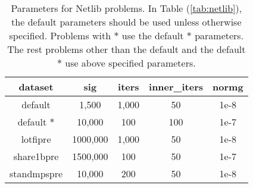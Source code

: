 \documentclass[a4paper]{article}
\begin{document}
\begin{table}[h]
	\centering
	\begin{tabular}{ccccc}
		\hline
		dataset & sig & iters & inner\_iters & normg  \\ 
		\hline 
		default & 1,500 & 1,000 & 50 & 1e-8 \\
		default $*$ & 10,000 & 100 & 100 & 1e-7 \\
		lotfipre & 1000,000 & 1,000 & 50 & 1e-8\\ 
		share1bpre & 1500,000 & 100 & 50 & 1e-7 \\
		standmpspre & 10,000 & 200 & 50 & 1e-8 \\
		\hline
	\end{tabular}
	\caption{Parameters for Netlib problems. In Table (\ref{tab:netlib}), the default parameters should be used unless otherwise specified. Problems with $*$ use the default $*$ parameters. The rest problems other than the default and the default $*$ use above specified parameters. }
	\label{tab:parameter}
\end{table}





\appendix  
\end{document}
